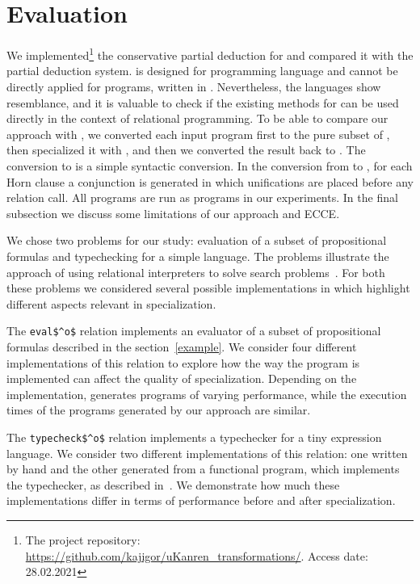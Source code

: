 \section{Evaluation}
\label{evaluation}

We implemented\footnote{The project repository: \url{https://github.com/kajigor/uKanren_transformations/}. Access date: 28.02.2021} the conservative partial deduction for \mk and compared it with the \ecce partial deduction system.
\ecce is designed for \pro programming language and cannot be directly applied for programs, written in \mk.
Nevertheless, the languages show resemblance, and it is valuable to check if the existing methods for \pro can be used directly in the context of relational programming.
To be able to compare our approach with \ecce, we converted each input program first to the pure subset of \pro, then specialized it with \ecce, and then we converted the result back to \mk.
The conversion to \pro is a simple syntactic conversion. In the conversion from \pro to \mk, for each Horn clause a conjunction is generated in which unifications are placed before any relation call.
All programs are run as \mk programs in our experiments.
In the final subsection we discuss some limitations of our approach and ECCE.

We chose two problems for our study: evaluation of a subset of propositional formulas and typechecking for a simple language.
The problems illustrate the approach of using relational interpreters to solve search problems~\cite{lozov2019relational}.
For both these problems we considered several possible implementations in \mk which highlight different aspects relevant in specialization.

The \lstinline{eval$^o$} relation implements an evaluator of a subset of propositional formulas described in the section~\ref{example}.
We consider four different implementations of this relation to explore how the way the program is implemented can affect the quality of specialization.
Depending on the implementation, \ecce generates programs of varying performance, while the execution times of the programs generated by our approach are similar.

The \lstinline{typecheck$^o$} relation implements a typechecker for a tiny expression language.
We consider two different implementations of this relation: one written by hand and the other generated from a functional program, which implements the typechecker, as described in~\cite{lozov2019relational}.
We demonstrate how much these implementations differ in terms of performance before and after specialization.

